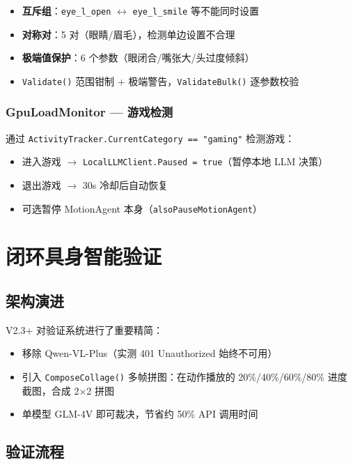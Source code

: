 \documentclass[12pt,a4paper]{ctexart}
\begin{document}
\begin{itemize}
    \item \textbf{互斥组}：\texttt{eye\_l\_open} $\leftrightarrow$ \texttt{eye\_l\_smile} 等不能同时设置
    \item \textbf{对称对}：5 对（眼睛/眉毛），检测单边设置不合理
    \item \textbf{极端值保护}：6 个参数（眼闭合/嘴张大/头过度倾斜）
    \item \texttt{Validate()} 范围钳制 + 极端警告，\texttt{ValidateBulk()} 逐参数校验
\end{itemize}

\subsubsection{GpuLoadMonitor --- 游戏检测}

通过 \texttt{ActivityTracker.CurrentCategory == "gaming"} 检测游戏：
\begin{itemize}
    \item 进入游戏 $\rightarrow$ \texttt{LocalLLMClient.Paused = true}（暂停本地 LLM 决策）
    \item 退出游戏 $\rightarrow$ 30s 冷却后自动恢复
    \item 可选暂停 MotionAgent 本身（\texttt{alsoPauseMotionAgent}）
\end{itemize}

\section{闭环具身智能验证}

\subsection{架构演进}

V2.3+ 对验证系统进行了重要精简：

\begin{itemize}
    \item 移除 Qwen-VL-Plus（实测 401 Unauthorized 始终不可用）
    \item 引入 \texttt{ComposeCollage()} 多帧拼图：在动作播放的 20\%/40\%/60\%/80\% 进度截图，合成 2×2 拼图
    \item 单模型 GLM-4V 即可裁决，节省约 50\% API 调用时间
\end{itemize}

\subsection{验证流程}
\end{document}
